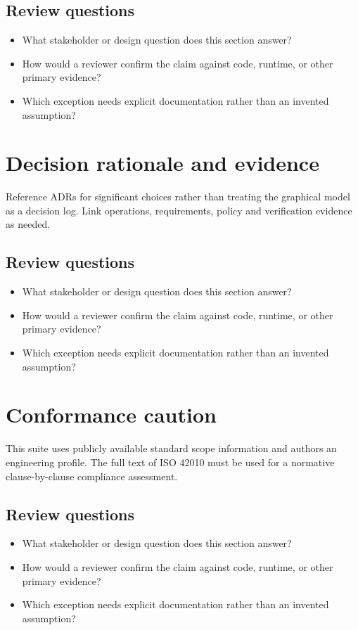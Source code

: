 \documentclass[10pt,letterpaper]{article}
\begin{document}
\subsection{Review questions}
\begin{itemize}
\item What stakeholder or design question does this section answer?
\item How would a reviewer confirm the claim against code, runtime, or other primary evidence?
\item Which exception needs explicit documentation rather than an invented assumption?
\end{itemize}

\section{Decision rationale and evidence}
Reference ADRs for significant choices rather than treating the graphical model as a decision log. Link operations, requirements, policy and verification evidence as needed.


\subsection{Review questions}
\begin{itemize}
\item What stakeholder or design question does this section answer?
\item How would a reviewer confirm the claim against code, runtime, or other primary evidence?
\item Which exception needs explicit documentation rather than an invented assumption?
\end{itemize}

\section{Conformance caution}
This suite uses publicly available standard scope information and authors an engineering profile. The full text of ISO 42010 must be used for a normative clause-by-clause compliance assessment.


\subsection{Review questions}
\begin{itemize}
\item What stakeholder or design question does this section answer?
\item How would a reviewer confirm the claim against code, runtime, or other primary evidence?
\item Which exception needs explicit documentation rather than an invented assumption?
\end{itemize}
\end{document}

